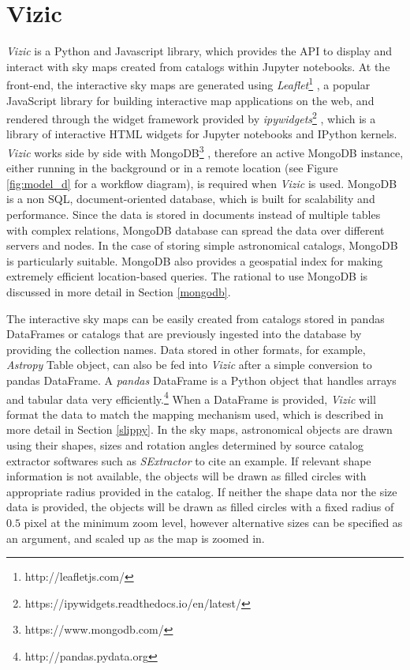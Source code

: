 \documentclass[5p,authoryear]{elsarticle}
\begin{document}
\section{Vizic}
\label{package}
\textit{Vizic} is a Python and Javascript library, which provides the API to display and interact with sky maps created from catalogs within Jupyter notebooks.
At the front-end, the interactive sky maps are generated using \textit{Leaflet}\footnote{http://leafletjs.com/} \citep{leaflet}, a popular JavaScript library for building interactive map applications on the web, and rendered through the widget framework provided by \textit{ipywidgets}\footnote{https://ipywidgets.readthedocs.io/en/latest/} \citep{ipywidgets}, which is a library of interactive HTML widgets for Jupyter notebooks and IPython kernels.
\textit{Vizic} works side by side with MongoDB\footnote{https://www.mongodb.com/} \citep{mongo}, therefore an active MongoDB instance, either running in the background or in a remote location (see Figure \ref{fig:model_d} for a workflow diagram), is required when \textit{Vizic} is used.
MongoDB is a non SQL, document-oriented database, which is built for scalability and performance. Since the data is stored in documents instead of multiple tables with complex relations, MongoDB database can spread the data over different servers and nodes. In the case of storing simple astronomical catalogs, MongoDB is particularly suitable. MongoDB also provides a geospatial index for making extremely efficient location-based queries. The rational to use MongoDB is discussed in more detail in Section \ref{mongodb}.

The interactive sky maps can be easily created from catalogs stored in pandas \citep{pandas} DataFrames or catalogs that are previously ingested into the database by providing the collection names. Data stored in other formats, for example, \textit{Astropy} \citep{astropy} Table object, can also be fed into \textit{Vizic} after a simple conversion to pandas DataFrame.
A \textit{pandas} DataFrame is a Python object that handles arrays and tabular data very efficiently.\footnote{http://pandas.pydata.org}
When a DataFrame is provided, \textit{Vizic} will format the data to match the mapping mechanism used, which is described in more detail in Section \ref{slippy}.
In the sky maps, astronomical objects are drawn using their shapes, sizes and rotation angles determined by source catalog extractor softwares such as \textit{SExtractor} \citep{sextractor} to cite an example.
If relevant shape information is not available, the objects will be drawn as filled circles with appropriate radius provided in the catalog. If neither the shape data nor the size data is provided, the objects will be drawn as filled circles with a fixed radius of $0.5$ pixel at the minimum zoom level, however alternative sizes can be specified as an argument, and scaled up as the map is zoomed in.
\end{document}
